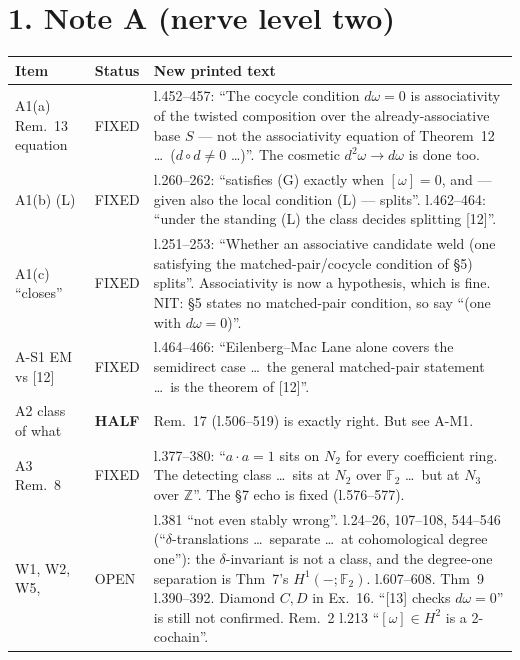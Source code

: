\documentclass[10pt]{article}
\newcommand{\Z}{\mathbb{Z}}
\newcommand{\F}{\mathbb{F}}
\begin{document}
\section*{1. Note A (nerve level two)}
\begin{tabular}{p{2.2cm}p{1.5cm}p{12.5cm}}
\toprule
Item & Status & New printed text\\\midrule
A1(a) Rem.~13 equation & FIXED & l.452--457: ``The cocycle condition $d\omega=0$ is associativity of the twisted composition over the
already-associative base $S$ --- not the associativity equation of Theorem~12 \dots\ ($d\circ d\neq0$ \dots)''. The
cosmetic $d^2\omega\to d\omega$ is done too.\\
A1(b) (L) & FIXED & l.260--262: ``satisfies (G) exactly when $[\omega]=0$, and --- given also the local condition (L) ---
splits''. l.462--464: ``under the standing (L) the class decides splitting [12]''.\\
A1(c) ``closes'' & FIXED & l.251--253: ``Whether an associative candidate weld (one satisfying the matched-pair/cocycle condition
of \S5) splits''. Associativity is now a hypothesis, which is fine. NIT: \S5 states no matched-pair condition, so say
``(one with $d\omega=0$)''.\\
A-S1 EM vs [12] & FIXED & l.464--466: ``Eilenberg--Mac Lane alone covers the semidirect case \dots\ the general matched-pair
statement \dots\ is the theorem of [12]''.\\
A2 class of what & \textbf{HALF} & Rem.~17 (l.506--519) is exactly right. But see A-M1.\\
A3 Rem.~8 & FIXED & l.377--380: ``$a\cdot a=1$ sits on $N_2$ for every coefficient ring. The detecting class \dots\ sits at
$N_2$ over $\F_2$ \dots\ but at $N_3$ over $\Z$''. The \S7 echo is fixed (l.576--577).\\
W1, W2, W5, & OPEN & l.381 ``not even stably wrong''. l.24--26, 107--108, 544--546 (``$\delta$-translations \dots\ separate \dots\ at
cohomological degree one''): the $\delta$-invariant is not a class, and the degree-one separation is Thm~7's
$H^1(-;\F_2)$. l.607--608. Thm~9 l.390--392. Diamond $C,D$ in Ex.~16. ``[13] checks $d\omega=0$'' is still not
confirmed. Rem.~2 l.213 ``$[\omega]\in H^2$ is a 2-cochain''.\\
\bottomrule
\end{tabular}
\end{document}

